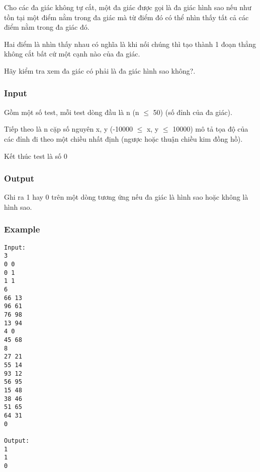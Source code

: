 



   Cho các đa giác không tự cắt, một đa giác được gọi là đa giác hình sao nếu như tồn tại một điểm nằm trong đa giác mà từ điểm đó có thể nhìn thấy tất cả các điểm nằm trong đa giác đó.   


   Hai điểm là nhìn thấy nhau có nghĩa là khi nối chúng thì tạo thành 1 đoạn thẳng không cắt bất cứ một cạnh nào của đa giác.   


   Hãy kiểm tra xem đa giác có phải là đa giác hình sao không?.  

\subsubsection{   Input  }

   Gồm một số test, mỗi test dòng đầu là n (n  $\le$  50) (số đỉnh của đa giác).   


   Tiếp theo là n cặp số nguyên x, y (-10000  $\le$  x, y  $\le$  10000) mô tả tọa độ của các đỉnh đi theo một chiều nhất định (ngược hoặc thuận chiều kim đồng hồ).   


   Kết thúc test là số 0  

\subsubsection{   Output  }

   Ghi ra 1 hay 0 trên một dòng tương ứng nếu đa giác là hình sao hoặc không là hình sao.  

\subsubsection{   Example  }
\begin{verbatim}
Input:
3
0 0
0 1
1 1
6
66 13
96 61
76 98
13 94
4 0
45 68
8
27 21
55 14
93 12
56 95
15 48
38 46
51 65
64 31
0

Output:
1
1
0
\end{verbatim}
